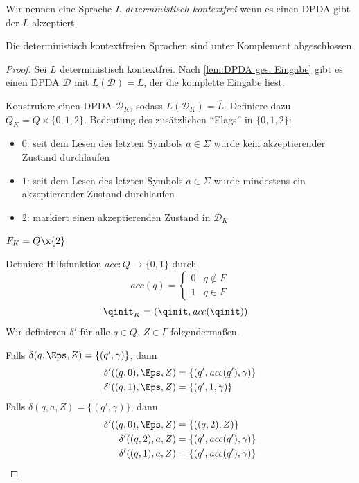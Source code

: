 \begin{Def}
 Wir nennen eine Sprache $L$ \emph{deterministisch kontextfrei} wenn es einen \ac{DPDA} gibt der $L$ akzeptiert.
\end{Def}


\begin{Satz}[name={[Abgeschlossenheit der deterministischen \acs*{CFL}]}]
        Die deterministisch kontextfreien Sprachen sind unter Komplement abgeschlossen.
\end{Satz}
\begin{proof}
  Sei $L$ deterministisch kontextfrei. 
  Nach \autoref{lem:DPDA ges. Eingabe} gibt es einen \ac{DPDA} $\mathcal{D}$ mit $L(\mathcal{D})=L$, der die komplette Eingabe liest.

  Konstruiere einen \ac{DPDA} $\mathcal{D}_K$, sodass $ L(\mathcal{D}_K) = \overline{L}$. 
  Definiere dazu $Q_K= Q \times \{0,1,2\}$. Bedeutung des zusätzlichen "`Flags"' in $\{0,1,2\}$:
  \begin{itemize}
  \item $0$: seit dem Lesen des letzten Symbols $a \in \Sigma$ wurde kein akzeptierender Zustand durchlaufen
  \item $1$: seit dem Lesen des letzten Symbols $a \in \Sigma$ wurde mindestens ein
    akzeptierender Zustand durchlaufen 
  \item $2$: markiert einen akzeptierenden Zustand in $\mathcal{D}_K$
  \end{itemize}
        
  $F_K=Q\x \{2\}$

  Definiere Hilfsfunktion $\mathit{acc}:Q\to \{0,1\}$ durch 
  \begin{displaymath}
    \mathit{acc} (q) =
    \begin{cases}
      0 & q\notin F \\ 1 & q \in F
    \end{cases}
  \end{displaymath}
  \begin{align*}
    \qinit_K &= (\qinit,\mathit{acc} (\qinit))
  \end{align*}
  Wir definieren $\delta'$ für alle $q \in Q$, $Z\in\Gamma$ folgendermaßen.
  
  Falls $\delta(q,\Eps,Z) = \{(q',\gamma)\}$, dann
  \begin{align*}
    \delta'((q,0),\Eps,Z) &= \{(q',\mathit{acc} (q'),\gamma)\}
    \\
    \delta'((q,1),\Eps,Z) &= \{(q',1,\gamma)\}
  \end{align*}
  Falls $\delta(q,a,Z) = \{(q',\gamma)\}$, dann
  \begin{align*}
    \delta'((q,0), \Eps, Z) &= \{ ((q,2), Z) \} \\
    \delta'((q,2), a, Z) &=\{(q',\mathit{acc} (q'), \gamma)\}
    \\
    \delta'((q,1), a, Z) &=
    \{(q',\mathit{acc} (q'), \gamma)\}
    \qedhere    %
  \end{align*}
\end{proof}

